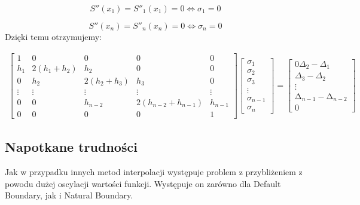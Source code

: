 \documentclass{article}
\begin{document}
\[S''(x_1) = S''_1(x_1) = 0 \Leftrightarrow \sigma_1 = 0\]

\[S''(x_n) = S''_n(x_n) = 0 \Leftrightarrow \sigma_n = 0\]
\noindent
Dzięki temu otrzymujemy:

\begin{gather*}
\begin{bmatrix}
1 & 0 & 0 & 0 & 0 \\
h_1 & 2(h_1+h_2) & h_2 & 0 & 0 \\
0 & h_2 & 2(h_2+h_3) & h_3 & 0 \\
\vdots & \vdots & \vdots & \vdots & \vdots \\
0 & 0 & h_{n-2} & 2(h_{n-2} + h_{n-1}) & h_{n-1} \\
0 & 0 & 0 & 0 & 1 
\end{bmatrix}
\begin{bmatrix}
\sigma_1 \\
\sigma_2 \\
\sigma_3 \\
\vdots \\
\sigma_{n-1} \\
\sigma_n 
\end{bmatrix}
=
\begin{bmatrix}
0 
\Delta_2 - \Delta_1 \\
\Delta_3 - \Delta_2 \\
\vdots \\
\mathrm{\Delta}_{n-1}^{} - \mathrm{\Delta}_{n-2}^{} \\
0
\end{bmatrix}
\end{gather*}

\newpage

\subsection{Napotkane trudności}

Jak w przypadku innych metod interpolacji występuje problem z przybliżeniem z powodu dużej oscylacji wartości funkcji. Występuje on zarówno dla Default Boundary, jak i Natural Boundary.
\end{document}
